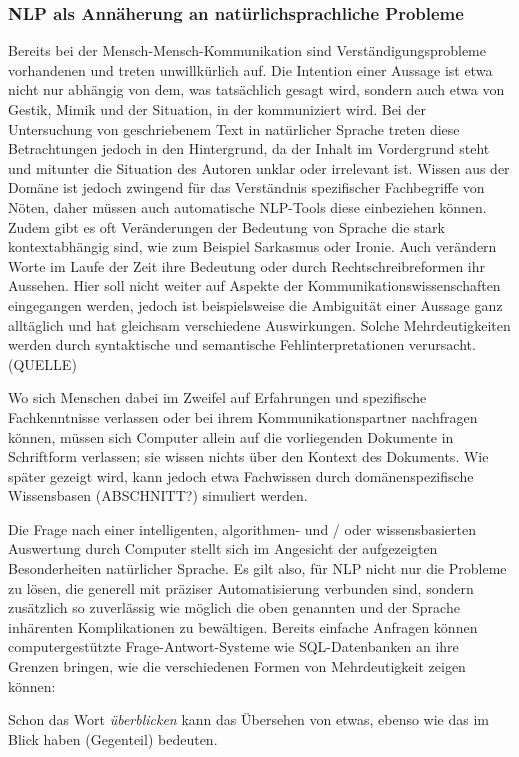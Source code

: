 \documentclass[12pt]{paper}
\begin{document}
\subsubsection{NLP als Annäherung an natürlichsprachliche Probleme}
Bereits bei der Mensch-Mensch-Kommunikation sind  Verständigungsprobleme vorhandenen und treten unwillkürlich auf. Die Intention einer Aussage ist etwa nicht nur abhängig von dem, was tatsächlich gesagt wird, sondern auch etwa von Gestik, Mimik und der Situation, in der kommuniziert wird. Bei der Untersuchung von geschriebenem Text in natürlicher Sprache treten diese Betrachtungen jedoch in den Hintergrund, da der Inhalt im Vordergrund steht und mitunter die Situation des Autoren unklar oder irrelevant ist. Wissen aus der Domäne ist jedoch zwingend für das Verständnis spezifischer Fachbegriffe von Nöten, daher müssen auch automatische NLP-Tools diese einbeziehen können. Zudem gibt es oft Veränderungen der Bedeutung von Sprache die stark kontextabhängig sind, wie zum Beispiel Sarkasmus oder Ironie. Auch verändern Worte im Laufe der Zeit ihre Bedeutung oder durch Rechtschreibreformen ihr Aussehen. Hier soll nicht weiter auf Aspekte der Kommunikationswissenschaften eingegangen werden, jedoch ist beispielsweise die Ambiguität einer Aussage ganz alltäglich und hat gleichsam verschiedene Auswirkungen. Solche Mehrdeutigkeiten werden durch syntaktische und semantische Fehlinterpretationen verursacht. (QUELLE)

Wo sich Menschen dabei im Zweifel auf Erfahrungen und spezifische Fachkenntnisse verlassen oder bei ihrem Kommunikationspartner nachfragen können, müssen sich Computer allein auf die vorliegenden Dokumente in Schriftform verlassen; sie wissen nichts über den Kontext des Dokuments. Wie später gezeigt wird, kann jedoch etwa Fachwissen durch domänenspezifische Wissensbasen (ABSCHNITT?) simuliert werden. 

Die Frage nach einer intelligenten, algorithmen- und / oder wissensbasierten Auswertung durch Computer stellt sich im Angesicht der aufgezeigten Besonderheiten natürlicher Sprache. Es gilt also, für NLP nicht nur die Probleme zu lösen, die generell mit präziser Automatisierung verbunden sind, sondern zusätzlich so zuverlässig wie möglich die oben genannten und der Sprache inhärenten Komplikationen zu bewältigen. 
Bereits einfache Anfragen können computergestützte Frage-Antwort-Systeme wie SQL-Datenbanken an ihre Grenzen bringen, wie die verschiedenen Formen von Mehrdeutigkeit zeigen können:

Schon das Wort \textit{überblicken} kann das Übersehen von etwas, ebenso wie das im Blick haben (Gegenteil) bedeuten.
\end{document}
